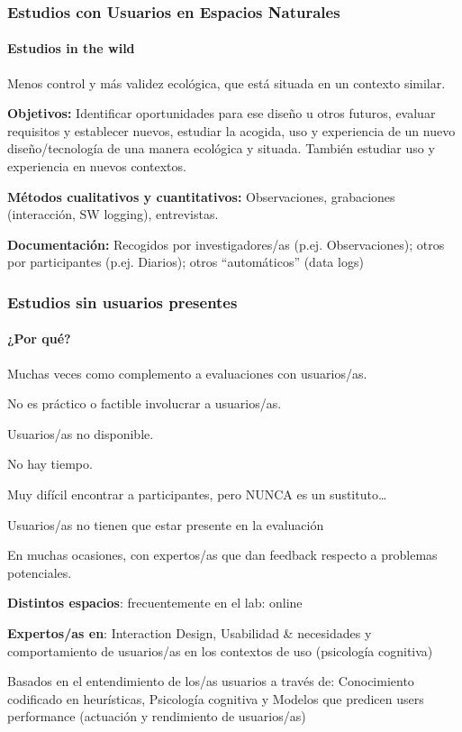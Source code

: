 \documentclass[12pt, twoside, openright]{report} %
\begin{document}
\subsubsection{Estudios con Usuarios en Espacios Naturales}
\paragraph{Estudios in the wild}        
Menos control y más validez ecológica, que está situada en un contexto similar.
          
\textbf{Objetivos:} Identificar oportunidades para ese diseño u otros futuros, evaluar requisitos y establecer nuevos, estudiar la acogida, uso y experiencia de un nuevo diseño/tecnología de una manera ecológica y situada. También estudiar uso y experiencia en nuevos contextos.
          
\textbf{Métodos cualitativos y cuantitativos:} Observaciones, grabaciones (interacción, SW logging), entrevistas.

\textbf{Documentación:} Recogidos por investigadores/as (p.ej. Observaciones); otros por participantes (p.ej. Diarios); otros “automáticos” (data logs)

\subsubsection{Estudios sin usuarios presentes}
\paragraph{¿Por qué?}        
Muchas veces como complemento a evaluaciones con usuarios/as.

No es práctico o factible involucrar a usuarios/as.

Usuarios/as no disponible.

No hay tiempo.

Muy difícil encontrar a participantes, pero NUNCA es un sustituto…

Usuarios/as no tienen que estar presente en la evaluación

En muchas ocasiones, con expertos/as que dan feedback respecto a problemas
potenciales.

\textbf{Distintos espacios}: frecuentemente en el lab: online

\textbf{Expertos/as en}: Interaction Design, Usabilidad \& necesidades y comportamiento de usuarios/as en los contextos de uso (psicología cognitiva)

Basados en el entendimiento de los/as usuarios a través de: Conocimiento codificado en heurísticas, Psicología cognitiva y Modelos que predicen users performance (actuación y rendimiento de usuarios/as)
\end{document}
